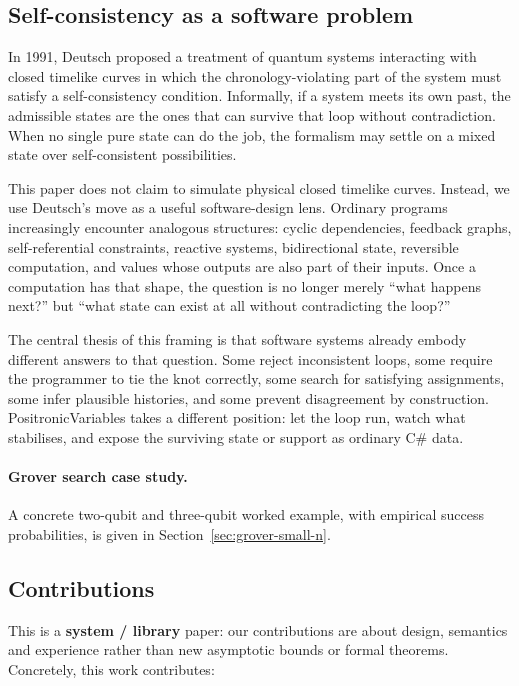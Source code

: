\documentclass[a4paper,11pt]{article}
\begin{document}
\subsection{Self-consistency as a software problem}

In 1991, Deutsch proposed a treatment of quantum systems interacting with closed
timelike curves in which the chronology-violating part of the system must satisfy
a self-consistency condition.\parencite{Deutsch91CTC} Informally, if a system
meets its own past, the admissible states are the ones that can survive that loop
without contradiction. When no single pure state can do the job, the formalism may
settle on a mixed state over self-consistent possibilities.

This paper does not claim to simulate physical closed timelike curves. Instead, we
use Deutsch's move as a useful software-design lens. Ordinary programs increasingly
encounter analogous structures: cyclic dependencies, feedback graphs, self-referential
constraints, reactive systems, bidirectional state, reversible computation, and values
whose outputs are also part of their inputs. Once a computation has that shape, the
question is no longer merely ``what happens next?'' but ``what state can exist at all
without contradicting the loop?''

The central thesis of this framing is that software systems already embody different
answers to that question. Some reject inconsistent loops, some require the programmer
to tie the knot correctly, some search for satisfying assignments, some infer plausible
histories, and some prevent disagreement by construction. PositronicVariables takes a
different position: let the loop run, watch what stabilises, and expose the surviving
state or support as ordinary C\# data.

\paragraph{Grover search case study.}

A concrete two-qubit and three-qubit worked example, with empirical success probabilities, is given in Section~\ref{sec:grover-small-n}.
\subsection{Contributions}

This is a \textbf{system / library} paper: our contributions are about design, semantics and experience rather than new asymptotic bounds or formal theorems. Concretely, this work contributes:
\end{document}
